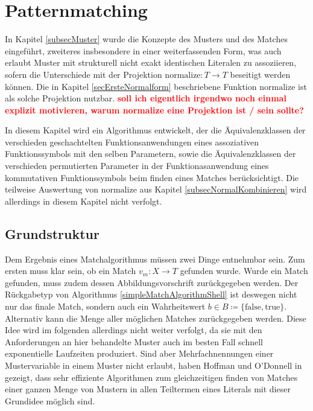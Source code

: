 \documentclass{scrartcl}
\numberwithin{figure}{section} %
\theoremstyle{definition} %
\newcommand{\BFred}[1]{\textbf{\textcolor{red}{#1}}}
\begin{document}
\section{Patternmatching} \label{secPattermatching}

In Kapitel \ref{subsecMuster} wurde die Konzepte des Musters und des Matches eingeführt, zweiteres insbesondere in einer weiterfassenden Form, was auch erlaubt Muster mit strukturell nicht exakt identischen Literalen zu assoziieren, sofern die Unterschiede mit der Projektion $\mathrm{normalize} \colon T \rightarrow T$ beseitigt werden können. Die in Kapitel \ref{secErsteNormalform} beschriebene Funktion $\mathrm{normalize}$ ist als solche Projektion nutzbar. \BFred{soll ich eigentlich irgendwo noch einmal explizit motivieren, warum normalize eine Projektion ist / sein sollte?} 

In diesem Kapitel wird ein Algorithmus entwickelt, der die Äquivalenzklassen der verschieden geschachtelten Funktionsanwendungen eines assoziativen Funktionssymbols mit den selben Parametern, sowie die Äquivalenzklassen der verschieden permutierten Parameter in der Funktionasanwendung eines kommutativen Funktionssymbols beim finden eines Matches berücksichtigt. Die teilweise Auswertung von $\mathrm{normalize}$ aus Kapitel \ref{subsecNormalKombinieren} wird allerdings in diesem Kapitel nicht verfolgt.

\subsection{Grundstruktur} \label{subsecPatternmatchingGrundstruktur}


Dem Ergebnis eines Matchalgorithmus müssen zwei Dinge entnehmbar sein. Zum ersten muss klar sein, ob ein Match $v_m \colon X \rightarrow T$ gefunden wurde. Wurde ein Match gefunden, muss zudem dessen Abbildungsvorschrift zurückgegeben werden. Der Rückgabetyp von Algorithmus \ref{simpleMatchAlgorithmShell} ist deswegen nicht nur das finale Match, sondern auch ein Wahrheitswert $b \in B \coloneqq \{\mathrm{false}, \mathrm{true}\}$. Alternativ kann die Menge aller möglichen Matches zurückgegeben werden. Diese Idee wird im folgenden allerdings nicht weiter verfolgt, da sie mit den Anforderungen an hier behandelte Muster auch im besten Fall schnell exponentielle Laufzeiten produziert. Sind aber Mehrfachnennungen einer Mustervariable in einem Muster nicht erlaubt, haben Hoffman und O'Donnell in \cite{patternMatchingInTrees} gezeigt, dass sehr effiziente Algorithmen zum gleichzeitigen finden von Matches einer ganzen Menge von Mustern in allen Teiltermen eines Literals mit dieser Grundidee möglich sind.\\
\end{document}

